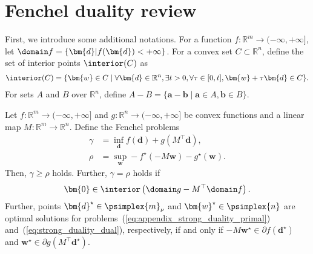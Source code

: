 \section{Fenchel duality review}
\label{appendix:fenchel_duality}
First, we introduce some additional notations.
For a function $f : \mathbb{R}^m \to (-\infty, +\infty]$, 
let $\domain f = \{ \bm{d} | f(\bm{d}) < +\infty \}$. 
For a convex set $C \subset \mathbb{R}^n$, 
define the set of interior points $\interior(C)$ as
\begin{align*}
    \interior(C) = \{
        \bm{w} \in C \mid
            \forall \bm{d} \in \mathbb{R}^n,
            \exists t > 0,
            \forall \tau \in [0, t], \bm{w} + \tau \bm{d} \in C
    \}.
\end{align*}
For sets $A$ and $B$ over $\mathbb R^n$, 
define $A - B = \{ \bm{a} - \bm{b} \mid \bm{a} \in A, \bm{b} \in B\}$. 

\begin{theorem}
    \label{thm:appendix_strong_duality}
    Let $f : \mathbb{R}^m \to (-\infty, +\infty]$ and 
    $g : \mathbb{R}^n \to (-\infty, +\infty]$ be convex functions 
    and a linear map $M : \mathbb{R}^m \to \mathbb{R}^n$. 
    Define the Fenchel problems
    \begin{align}
        \label{eq:appendix_strong_duality_primal}
        \gamma & = \inf_{\bm{d}} f(\bm{d}) + g(M^\top\bm{d}), \\
        \label{eq:appendix_strong_duality_dual}
        \rho   & = \sup_{\bm{w}} -f^\star(-M \bm{w}) - g^\star(\bm{w}).
    \end{align}
    Then, $\gamma \geq \rho$ holds. Further, $\gamma = \rho$ holds if 
    \begin{align}
        \label{eq:appendix_strong_duality_qualification}
        \bm{0} \in 
        \interior
        \left(\domain g - M^\top \domain f\right).
    \end{align}
    Further, points $\bm{d}^\star \in \psimplex{m}_{\nu}$ and 
    $\bm{w}^\star \in \psimplex{n}$ are optimal solutions 
    for problems~(\ref{eq:appendix_strong_duality_primal}) 
    and~(\ref{eq:strong_duality_dual}), respectively, 
    if and only if $-M \bm{w}^\star \in \partial f(\bm{d}^\star)$ 
    and $\bm{w}^\star \in \partial g(M^\top \bm{d}^\star)$.
\end{theorem}
